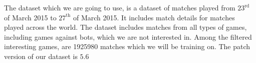 The dataset which we are going to use, is a dataset of matches played from $23^{\text{rd}}$ of March 2015 to $27^{\text{th}}$ of March 2015. It includes match details for matches played across the world. The dataset includes matches from all types of games, including games against bots, which we are not interested in. Among the filtered interesting games, are 1925980 matches which we will be training on. The patch version of our dataset is $5.6$


